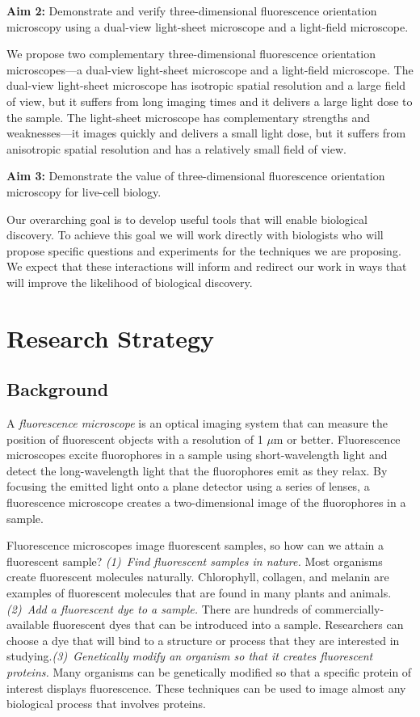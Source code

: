 \documentclass[11pt]{article}
\begin{document}
\noindent\textbf{Aim 2:} Demonstrate and verify three-dimensional fluorescence
orientation microscopy using a dual-view light-sheet microscope and a
light-field microscope.

We propose two complementary three-dimensional fluorescence orientation
microscopes---a dual-view light-sheet microscope and a light-field
microscope. The dual-view light-sheet microscope has isotropic spatial
resolution and a large field of view, but it suffers from long imaging times and
it delivers a large light dose to the sample. The light-sheet microscope has
complementary strengths and weaknesses---it images quickly and delivers a small
light dose, but it suffers from anisotropic spatial resolution and has a
relatively small field of view.

\noindent\textbf{Aim 3:} Demonstrate the value of three-dimensional fluorescence
orientation microscopy for live-cell biology.

Our overarching goal is to develop useful tools that will enable biological
discovery. To achieve this goal we will work directly with biologists who will
propose specific questions and experiments for the techniques we are
proposing. We expect that these interactions will inform and redirect our work
in ways that will improve the likelihood of biological discovery.

\pagebreak

\section*{Research Strategy}
\subsection*{Background}
A \textit{fluorescence microscope} is an optical imaging system that can measure
the position of fluorescent objects with a resolution of 1 $\mu$m or better.
Fluorescence microscopes excite fluorophores in a sample using short-wavelength
light and detect the long-wavelength light that the fluorophores emit as they
relax. By focusing the emitted light onto a plane detector using a series of
lenses, a fluorescence microscope creates a two-dimensional image of the
fluorophores in a sample.

Fluorescence microscopes image fluorescent samples, so how can we attain a
fluorescent sample? \textit{(1)~Find fluorescent samples in nature.} Most
organisms create fluorescent molecules naturally. Chlorophyll, collagen, and
melanin are examples of fluorescent molecules that are found in many plants and
animals. \textit{(2)~Add a fluorescent dye to a sample.}  There are hundreds of
commercially-available fluorescent dyes that can be introduced into a
sample. Researchers can choose a dye that will bind to a structure or process
that they are interested in studying.\hspace{0.4em}\textit{(3)~Genetically
  modify an organism so that it creates fluorescent proteins.} Many organisms
can be genetically modified so that a specific protein of interest displays
fluorescence. These techniques can be used to image almost any biological
process that involves proteins.
\end{document}
